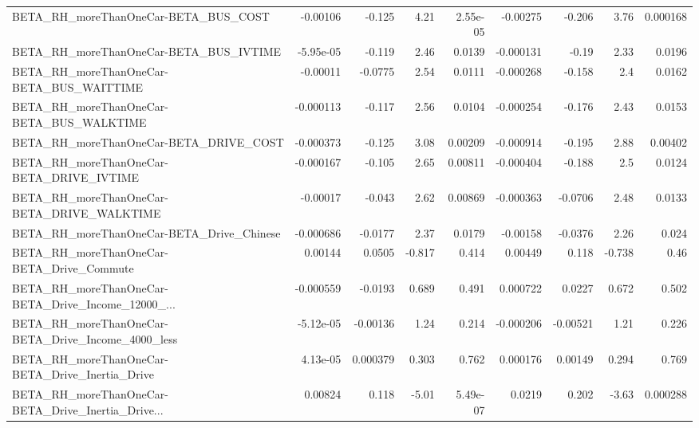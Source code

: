 \begin{tabular}{lrrrrrrrr}
BETA\_RH\_moreThanOneCar-BETA\_BUS\_COST               &    -0.00106 &       -0.125 &     4.21 & 2.55e-05 &   -0.00275 &      -0.206 &         3.76 &      0.000168 \\
BETA\_RH\_moreThanOneCar-BETA\_BUS\_IVTIME             &   -5.95e-05 &       -0.119 &     2.46 &   0.0139 &  -0.000131 &       -0.19 &         2.33 &        0.0196 \\
BETA\_RH\_moreThanOneCar-BETA\_BUS\_WAITTIME           &    -0.00011 &      -0.0775 &     2.54 &   0.0111 &  -0.000268 &      -0.158 &          2.4 &        0.0162 \\
BETA\_RH\_moreThanOneCar-BETA\_BUS\_WALKTIME           &   -0.000113 &       -0.117 &     2.56 &   0.0104 &  -0.000254 &      -0.176 &         2.43 &        0.0153 \\
BETA\_RH\_moreThanOneCar-BETA\_DRIVE\_COST             &   -0.000373 &       -0.125 &     3.08 &  0.00209 &  -0.000914 &      -0.195 &         2.88 &       0.00402 \\
BETA\_RH\_moreThanOneCar-BETA\_DRIVE\_IVTIME           &   -0.000167 &       -0.105 &     2.65 &  0.00811 &  -0.000404 &      -0.188 &          2.5 &        0.0124 \\
BETA\_RH\_moreThanOneCar-BETA\_DRIVE\_WALKTIME         &    -0.00017 &       -0.043 &     2.62 &  0.00869 &  -0.000363 &     -0.0706 &         2.48 &        0.0133 \\
BETA\_RH\_moreThanOneCar-BETA\_Drive\_Chinese          &   -0.000686 &      -0.0177 &     2.37 &   0.0179 &   -0.00158 &     -0.0376 &         2.26 &         0.024 \\
BETA\_RH\_moreThanOneCar-BETA\_Drive\_Commute          &     0.00144 &       0.0505 &   -0.817 &    0.414 &    0.00449 &       0.118 &       -0.738 &          0.46 \\
BETA\_RH\_moreThanOneCar-BETA\_Drive\_Income\_12000\_... &   -0.000559 &      -0.0193 &    0.689 &    0.491 &   0.000722 &      0.0227 &        0.672 &         0.502 \\
BETA\_RH\_moreThanOneCar-BETA\_Drive\_Income\_4000\_less &   -5.12e-05 &     -0.00136 &     1.24 &    0.214 &  -0.000206 &    -0.00521 &         1.21 &         0.226 \\
BETA\_RH\_moreThanOneCar-BETA\_Drive\_Inertia\_Drive    &    4.13e-05 &     0.000379 &    0.303 &    0.762 &   0.000176 &     0.00149 &        0.294 &         0.769 \\
BETA\_RH\_moreThanOneCar-BETA\_Drive\_Inertia\_Drive... &     0.00824 &        0.118 &    -5.01 & 5.49e-07 &     0.0219 &       0.202 &        -3.63 &      0.000288 \\

\end{tabular}
